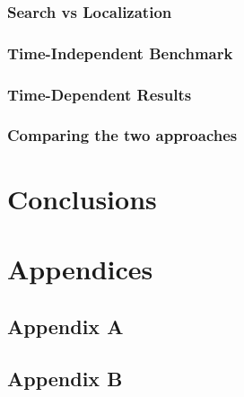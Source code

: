 \documentclass[11pt, twoside]{report}
\begin{document}
\subsection{Search vs Localization}
\subsection{Time-Independent Benchmark}
\subsection{Time-Dependent Results}
\subsection{Comparing the two approaches}



\newpage
\chapter*{Conclusions}

\newpage
\chapter*{Appendices}
\section*{Appendix A}
\section*{Appendix B}

\newpage
{}

\end{document}
